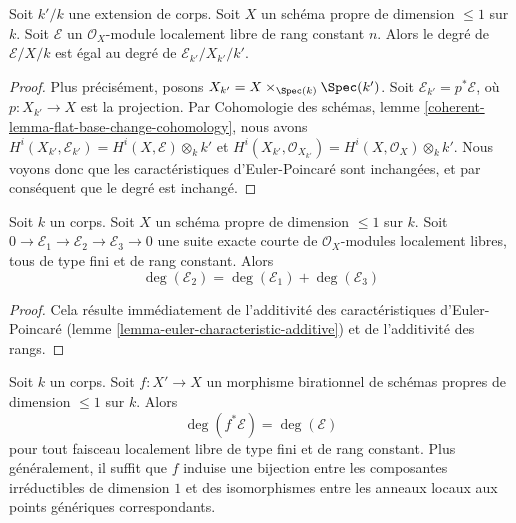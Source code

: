 \begin{lemma}
\label{lemma-degree-base-change}
Soit $k'/k$ une extension de corps. Soit $X$ un schéma propre de
dimension $\leq 1$ sur $k$. Soit $\mathcal{E}$ un
$\mathcal{O}_X$-module localement libre de rang constant $n$. Alors le degré de
$\mathcal{E}/X/k$ est égal au degré de
$\mathcal{E}_{k'}/X_{k'}/k'$.
\end{lemma}

\begin{proof}
Plus précisément, posons $X_{k'} = X \times_{\Spec(k)} \Spec(k')$.
Soit $\mathcal{E}_{k'} = p^*\mathcal{E}$, où $p : X_{k'} \to X$
est la projection. Par
Cohomologie des schémas, lemme \ref{coherent-lemma-flat-base-change-cohomology},
nous avons
$H^i(X_{k'}, \mathcal{E}_{k'}) = H^i(X, \mathcal{E}) \otimes_k k'$
et
$H^i(X_{k'}, \mathcal{O}_{X_{k'}}) = H^i(X, \mathcal{O}_X) \otimes_k k'$.
Nous voyons donc que les caractéristiques d'Euler-Poincaré sont inchangées, et par conséquent
que le degré est inchangé.
\end{proof}

\begin{lemma}
\label{lemma-degree-additive}
Soit $k$ un corps. Soit $X$ un schéma propre de dimension $\leq 1$
sur $k$. Soit $0 \to \mathcal{E}_1 \to \mathcal{E}_2 \to \mathcal{E}_3 \to 0$
une suite exacte courte de $\mathcal{O}_X$-modules localement libres,
tous de type fini et de rang constant. Alors
$$
\deg(\mathcal{E}_2) = \deg(\mathcal{E}_1) + \deg(\mathcal{E}_3)
$$
\end{lemma}

\begin{proof}
Cela résulte immédiatement de l'additivité des caractéristiques d'Euler-Poincaré
(lemme \ref{lemma-euler-characteristic-additive})
et de l'additivité des rangs.
\end{proof}

\begin{lemma}
\label{lemma-degree-birational-pullback}
Soit $k$ un corps. Soit $f : X' \to X$ un morphisme birationnel de
schémas propres de dimension $\leq 1$ sur $k$. Alors
$$
\deg(f^*\mathcal{E}) = \deg(\mathcal{E})
$$
pour tout faisceau localement libre de type fini et de rang constant. Plus généralement,
il suffit que $f$ induise une bijection entre les composantes irréductibles
de dimension $1$ et des isomorphismes entre les anneaux locaux aux
points génériques correspondants.
\end{lemma}

